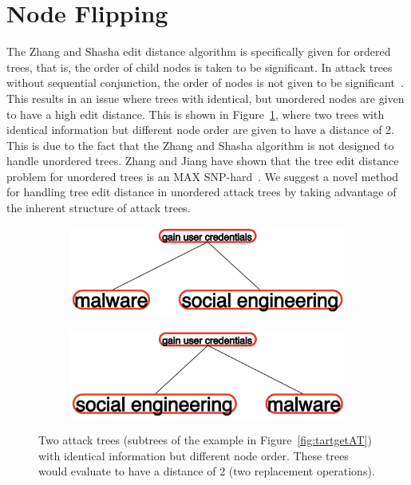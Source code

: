 \section{Node Flipping}

The Zhang and Shasha edit distance algorithm is specifically given for ordered trees, that is, the order of child nodes is taken to be significant. In attack trees without sequential conjunction, the order of nodes is not given to be significant~\cite{mauw_foundations_2006,jhawar_attack_2015}. This results in an issue where trees with identical, but unordered nodes are given to have a high edit distance. This is shown in Figure~\ref{fig:nodeflipping}, where two trees with identical information but different node order are given to have a distance of 2. This is due to the fact that the Zhang and Shasha algorithm is not designed to handle unordered trees. Zhang and Jiang have shown that the tree edit distance problem for unordered trees is an MAX SNP-hard~\cite{zhangMAXSNPhardResults1994}. We suggest a novel method for handling tree edit distance in unordered attack trees by taking advantage of the inherent structure of attack trees.


\begin{figure}
    \begin{subfigure}{.45\linewidth}
        \includegraphics[width=\linewidth]{img/NodeFlip1.png}
    \end{subfigure}
    \begin{subfigure}{.45\linewidth}
        \includegraphics[width=\linewidth]{img/NodeFlip2.png}
    \end{subfigure}
    \caption{Two attack trees (subtrees of the example in Figure~\ref{fig:tartgetAT}) with identical information but different node order. These trees would evaluate to have a distance of 2 (two replacement operations).}
    \label{fig:nodeflipping}
\end{figure}

